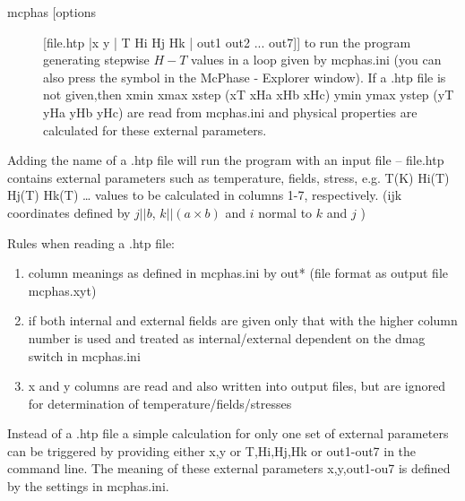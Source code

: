 \begin{description}
\item[\prg mcphas [options] [file.htp |x y | T Hi Hj Hk | out1 out2 ... out7]] to run the program generating stepwise $H-T$ values 
              in a loop given by {\prg mcphas.ini} (you can also press the
              symbol in the {\prg McPhase - Explorer} window). 
             If a .htp file is not given,then  xmin xmax xstep (xT xHa xHb xHc)
             ymin ymax ystep (yT yHa yHb yHc) are read from {\prg mcphas.ini}
	     and physical properties are  calculated for these external parameters.
\end{description}

              Adding the name of a .htp  file will run the program with an input file --   
             {\prg file.htp} contains external parameters such as temperature, fields, stress,
             e.g. T(K) Hi(T) Hj(T) Hk(T) \dots
             values to be calculated in columns 1-7, respectively. 
            (ijk coordinates defined by  $j||b$, $k||(a \times b)$ and $i$ normal to $k$ and $j$ )

Rules when reading a .htp file:
\begin{enumerate}
\item column meanings as defined in mcphas.ini by out* (file format as output file mcphas.xyt)
\item if both internal and external fields are given only that with the higher column number is used and
      treated as internal/external dependent on the dmag switch in mcphas.ini
\item x and y columns are read and also written into output files, but are ignored for determination of
             temperature/fields/stresses
\end{enumerate}

Instead of a .htp file a simple calculation for only one set of external parameters
can be triggered by providing either x,y or T,Hi,Hj,Hk or out1-out7 in the command line.
The meaning of these external parameters x,y,out1-ou7 is defined by the settings in mcphas.ini.


